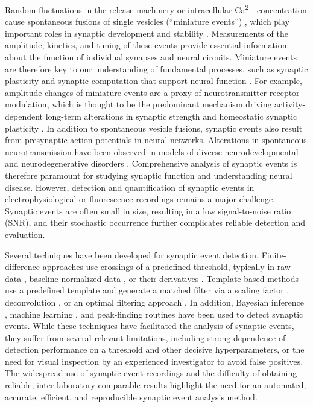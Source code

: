 \documentclass[9pt,lineno]{article}
\begin{document}
Random fluctuations in the release machinery or intracellular Ca\textsuperscript{2+} concentration cause spontaneous fusions of single vesicles (``miniature events'') \citep{Kavalali2015}, which play important roles in synaptic development and stability \citep{Banerjee2021,KaeserRegehr2014,Kavalali2015,McKinney1999}. Measurements of the amplitude, kinetics, and timing of these events provide essential information about the function of individual synapses and neural circuits. Miniature events are therefore key to our understanding of fundamental processes, such as synaptic plasticity and synaptic computation that support neural function \citep{AbbottRegehr2004,Holler2021}. For example, amplitude changes of miniature events are a proxy of neurotransmitter receptor modulation, which is thought to be the predominant mechanism driving activity-dependent long-term alterations in synaptic strength \citep{HuganirNicoll2013,MalinowMalenka2002} and homeostatic synaptic plasticity \citep{OBrien1998,Turrigiano1998}. In addition to spontaneous vesicle fusions, synaptic events also result from presynaptic action potentials in neural networks. Alterations in spontaneous neurotransmission have been observed in models of diverse neurodevelopmental and neurodegenerative disorders \citep{Alten2021,Ardiles2012,Miller2014}. Comprehensive analysis of synaptic events is therefore paramount for studying synaptic function and understanding neural disease. However, detection and quantification of synaptic events in electrophysiological or fluorescence recordings remains a major challenge. Synaptic events are often small in size, resulting in a low signal-to-noise ratio (SNR), and their stochastic occurrence further complicates reliable detection and evaluation.

Several techniques have been developed for synaptic event detection. Finite-difference approaches use crossings of a predefined threshold, typically in raw data \citep{Kim2021}, baseline-normalized data \citep{KudohTaguchi2002}, or their derivatives \citep{Ankri1994}. Template-based methods use a predefined template and generate a matched filter via a scaling factor \citep{ClementsBekkers1997,Jonas1993}, deconvolution \citep{PerniaAndrade2012}, or an optimal filtering approach \citep{Shi2010,Zhang2021}. In addition, Bayesian inference \citep{Merel2016}, machine learning \citep{Wang2024}, and peak-finding routines \citep{Mori2024} have been used to detect synaptic events. While these techniques have facilitated the analysis of synaptic events, they suffer from several relevant limitations, including strong dependence of detection performance on a threshold and other decisive hyperparameters, or the need for visual inspection by an experienced investigator to avoid false positives. The widespread use of synaptic event recordings and the difficulty of obtaining reliable, inter-laboratory-comparable results highlight the need for an automated, accurate, efficient, and reproducible synaptic event analysis method.
\end{document}
